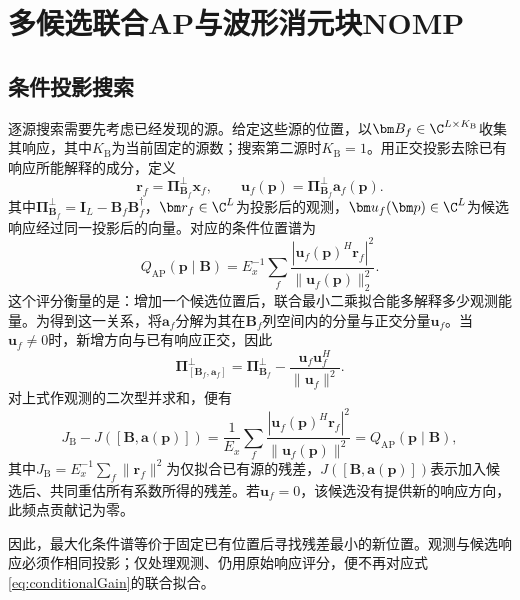 \section{多候选联合AP与波形消元块NOMP}\label{sec:methods}
\subsection{条件投影搜索}
逐源搜索需要先考虑已经发现的源。给定这些源的位置，以$\bm B_f\in\C^{L\times K_{\mathrm B}}$收集其响应，其中$K_{\mathrm B}$为当前固定的源数；搜索第二源时$K_{\mathrm B}=1$。用正交投影去除已有响应所能解释的成分，定义
\begin{equation}
 \bm r_f=\bm\Pi_{\bm B_f}^{\perp}\bm x_f,\qquad
 \bm u_f(\bm p)=\bm\Pi_{\bm B_f}^{\perp}\bm a_f(\bm p).
\end{equation}
其中$\bm\Pi_{\bm B_f}^{\perp}=\bm I_L-\bm B_f\bm B_f^\dagger$，$\bm r_f\in\C^L$为投影后的观测，$\bm u_f(\bm p)\in\C^L$为候选响应经过同一投影后的向量。对应的条件位置谱为
\begin{equation}
 Q_{\mathrm{AP}}(\bm p\mid\bm B)
 =E_x^{-1}\sum_f\frac{|\bm u_f(\bm p)^H\bm r_f|^2}
 {\|\bm u_f(\bm p)\|_2^2}.\label{eq:conditional}
\end{equation}
这个评分衡量的是：增加一个候选位置后，联合最小二乘拟合能多解释多少观测能量。为得到这一关系，将$\bm a_f$分解为其在$\bm B_f$列空间内的分量与正交分量$\bm u_f$。当$\bm u_f\ne0$时，新增方向与已有响应正交，因此
\begin{equation}
 \bm\Pi_{[\bm B_f,\bm a_f]}^{\perp}
 =\bm\Pi_{\bm B_f}^{\perp}
 -\frac{\bm u_f\bm u_f^H}{\|\bm u_f\|^2} .
\end{equation}
对上式作观测的二次型并求和，便有
\begin{equation}
 J_{\mathrm B}-J([\bm B,\bm a(\bm p)])
 =\frac1{E_x}\sum_f\frac{|\bm u_f(\bm p)^H\bm r_f|^2}
 {\|\bm u_f(\bm p)\|^2}
 =Q_{\mathrm{AP}}(\bm p\mid\bm B),\label{eq:conditionalGain}
\end{equation}
其中$J_{\mathrm B}=E_x^{-1}\sum_f\|\bm r_f\|^2$为仅拟合已有源的残差，$J([\bm B,\bm a(\bm p)])$表示加入候选后、共同重估所有系数所得的残差。若$\bm u_f=0$，该候选没有提供新的响应方向，此频点贡献记为零。

因此，最大化条件谱等价于固定已有位置后寻找残差最小的新位置\cite{ChenHudsonYao2002}。观测与候选响应必须作相同投影；仅处理观测、仍用原始响应评分，便不再对应式\eqref{eq:conditionalGain}的联合拟合。

